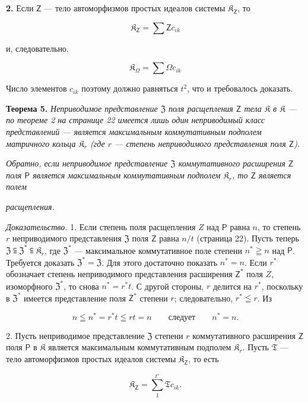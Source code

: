 \documentclass[11pt]{article}
\begin{document}
\textbf{2.} Если \(\mathsf{Z}\) --- тело автоморфизмов простых идеалов системы \(\mathfrak K_{\mathsf{Z}}\), то

\[
\mathfrak K_{\mathsf{Z}}=\sum\mathsf Zc_{ik}
\]

и, следовательно,

\[
\mathfrak K_\Omega=\sum\Omega c_{ik}
\]

Число элементов \(c_{ik}\) поэтому должно равняться \(t^2\), что и требовалось доказать.

\textbf{Теорема 5.} \emph{Неприводимое представление \(\mathfrak Z\) поля расщепления \(\mathsf{Z}\) тела \(\mathfrak K\) в \(\mathfrak K\) --- по теореме 2 на странице 22 имеется лишь один неприводимый класс представлений --- является максимальным коммутативным подполем матричного кольца \(\mathfrak K_r\) (где \(r\) --- степень неприводимого представления поля \(\mathsf{Z}\)).}

\emph{Обратно, если неприводимое представление \(\mathfrak Z\) коммутативного расширения \(\mathsf{Z}\) поля \(\mathsf P\) является максимальным коммутативным подполем \(\mathfrak K_r\), то \(\mathsf{Z}\) является полем}

\emph{расщепления.}

\emph{Доказательство.} 1. Если степень поля расщепления \(Z\) над \(\mathsf P\) равна \(n\), то степень \(r\) неприводимого представления \(\mathfrak Z\) поля \(\mathsf{Z}\) равна \(n/t\) (страница 22). Пусть теперь \(\mathfrak Z\subseteqq\mathfrak Z^*\subseteqq\mathfrak K_r\), где \(\mathfrak Z^*\) --- максимальное коммутативное поле степени \(n^*\geqq n\) над \(\mathsf P\). Требуется доказать \(\mathfrak Z^*=\mathfrak Z\). Для этого достаточно показать \(n^*=n\). Если \(r^*\) обозначает степень неприводимого представления расширения \(\mathsf{Z}^*\) поля \(Z\), изоморфного \(\mathfrak Z^*\), то снова \(n^*=r^*t\). С другой стороны, \(r\) делится на \(r^*\), поскольку в \(\mathfrak Z^*\) имеется представление поля \(\mathsf{Z}^*\) степени \(r\); следовательно, \(r^*\leqq r\). Из

\[
n\leqq n^*=r^*t\leqq rt=n \qquad\text{следует}\qquad n^*=n.
\]

2. Пусть неприводимое представление \(\mathfrak Z\) степени \(r\) коммутативного расширения \(\mathsf{Z}\) поля \(\mathsf P\) в \(\mathfrak K\) является максимальным коммутативным подполем \(\mathfrak K_r\). Пусть \(\mathfrak T\) --- тело автоморфизмов простых идеалов системы \(\mathfrak K_{\mathsf{Z}}\), то есть

\[
\mathfrak K_{\mathsf{Z}}=\sum_{1}^{t'}\mathfrak T c_{ik}.
\]
\end{document}
